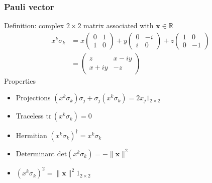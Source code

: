 \documentclass[../main.tex]{subfiles}
\begin{document}
\begin{itemize}
\subsubsection{Pauli vector}
Definition: complex $2\times2$ matrix associated with $\mathbf{x}\in \mathbb{R}$
\begin{align}
x^k\sigma_k
&=
x\left(\begin{matrix}
0 & 1\\
1 & 0
\end{matrix}\right)
+y\left(\begin{matrix}
0 & -i\\
i & 0
\end{matrix}\right)
+z\left(\begin{matrix}
1 & 0\\
0 & -1
\end{matrix}\right)\\
&=\left(\begin{matrix}
z & x-iy\\
x+iy & -z
\end{matrix}\right)
\end{align}
Properties
\begin{itemize}
\item Projections $(x^k\sigma_k)\sigma_j+\sigma_j(x^k\sigma_k)=2x_j1_{2\times2}$
\item Traceless $\text{tr}\,(x^k\sigma_k)=0$
\item Hermitian $(x^k\sigma_k)^\dagger=x^k\sigma_k$
\item Determinant $\text{det}(x^k\sigma_k)=-\|\mathbf{x}\|^2$
\item $(x^k\sigma_k)^2=\|\mathbf{x}\|^2 1_{2\times2}$
\end{itemize}



\end{itemize}
\end{document}
